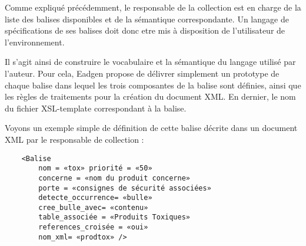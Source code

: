 Comme expliqué précédemment, le responsable de la collection est en
charge de la liste des balises disponibles et de la sémantique
correspondante. Un langage de spécifications de ses balises doit
donc etre mis à disposition de l'utilisateur de l'environnement.

Il s'agit ainsi de construire le vocabulaire et la sémantique
du langage utilisé par l'auteur. Pour cela, Eadgen propose de délivrer
simplement un prototype de chaque balise dans lequel les trois
composantes de la balise sont définies, ainsi que les règles
de traitements pour la création du document XML. En dernier, le
nom du fichier XSL-template correspondant à la balise.

Voyons un exemple simple de définition de cette balise décrite dans un document XML par le responsable de collection :
\begin{verbatim}
	<Balise
		nom = «tox» priorité = «50»
		concerne = «nom du produit concerne»
		porte = «consignes de sécurité associées»
		detecte_occurrence= «bulle»
		cree_bulle_avec= «contenu»
		table_associée = «Produits Toxiques»
		references_croisée = «oui»
		nom_xml= «prodtox» />
\end{verbatim}
